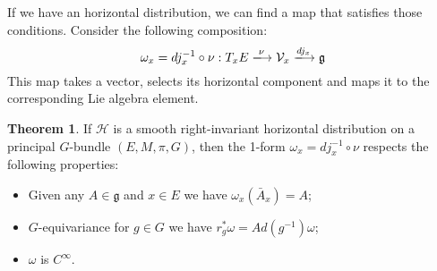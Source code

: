 \documentclass[12pt,a4paper]{report}
\theoremstyle{definition}
\theoremstyle{Theorem}
\newtheorem{Theo}[Def]{Theorem}
\theoremstyle{definition}
\theoremstyle{definition}
\begin{document}
	If we have an horizontal distribution, we can find a map that satisfies those conditions. Consider the following composition:
	$$\omega_{x}=dj_{x}^{-1}\circ \nu:T_{x}E\xlongrightarrow{\nu} \mathcal{V}_{x}\xlongrightarrow{dj_{x}}\mathfrak{g}$$
	This map takes a vector, selects its horizontal component and maps it to the corresponding Lie algebra element.
	\begin{Theo}
		If $\mathcal{H}$ is a smooth right-invariant horizontal distribution on a principal $G$-bundle $(E,M,\pi,G)$, then the 1-form $\omega_{x}=dj_{x}^{-1}\circ \nu$ respects the following properties:
		\begin{itemize}
			\item Given any $A\in\mathfrak{g}$ and $x\in E$ we have $\omega_{x}(\bar{A}_{x})=A$;
			\item $G$-equivariance for $g\in G$ we have $r^*_g\omega=Ad(g^{-1})\omega$;
			\item $\omega$ is $C^\infty$.
		\end{itemize}
	\end{Theo}
\end{document}
